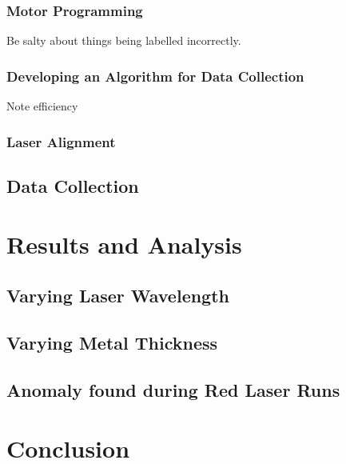 \documentclass[%
reprint,
amsmath,amssymb,
aps,
]{revtex4-2}
\begin{document}
			\subsubsection{Motor Programming}
				Be salty about things being labelled incorrectly.
			
			\subsubsection{Developing an Algorithm for Data Collection}
				Note efficiency
			
			\subsubsection{Laser Alignment}
			
		\subsection{Data Collection}
			\subsubsection{}
		
		
	
	\section{Results and Analysis}
		\subsection{Varying Laser Wavelength}
		
		\subsection{Varying Metal Thickness}
	
		\subsection{Anomaly found during Red Laser Runs}

	\section{Conclusion}
		
		
	\newpage
		
	\newpage
	\appendix
		
		
\end{document}

